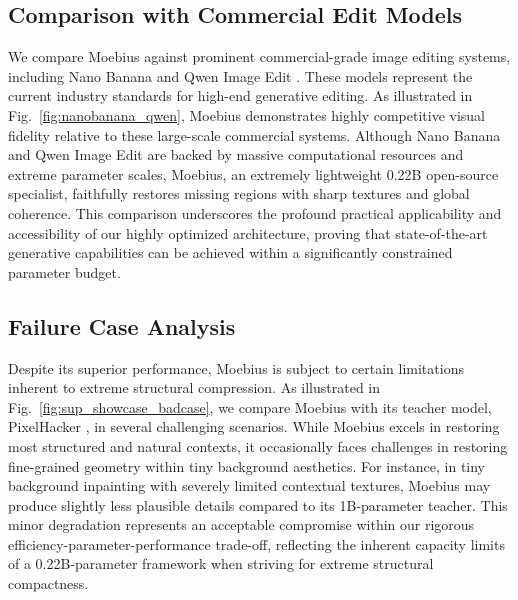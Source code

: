 \documentclass[runningheads]{llncs}
\begin{document}
\subsection*{Comparison with Commercial Edit Models} \label{sec:sup_commercial}
We compare Moebius against prominent commercial-grade image editing systems, including Nano Banana \cite{2025nano_banana} and Qwen Image Edit \cite{wu2025qwenimagetechnicalreport}. These models represent the current industry standards for high-end generative editing. As illustrated in Fig.~\ref{fig:nanobanana_qwen}, Moebius demonstrates highly competitive visual fidelity relative to these large-scale commercial systems. Although Nano Banana and Qwen Image Edit are backed by massive computational resources and extreme parameter scales, Moebius, an extremely lightweight 0.22B open-source specialist, faithfully restores missing regions with sharp textures and global coherence. This comparison underscores the profound practical applicability and accessibility of our highly optimized architecture, proving that state-of-the-art generative capabilities can be achieved within a significantly constrained parameter budget.


\vspace{-0.5em}
\subsection*{Failure Case Analysis} \label{sec:sup_failure}
\vspace{-2.5em}
Despite its superior performance, Moebius is subject to certain limitations inherent to extreme structural compression. As illustrated in Fig.~\ref{fig:sup_showcase_badcase}, we compare Moebius with its teacher model, PixelHacker \cite{xu2025pixelhacker}, in several challenging scenarios. While Moebius excels in restoring most structured and natural contexts, it occasionally faces challenges in restoring fine-grained geometry within tiny background aesthetics. For instance, in tiny background inpainting with severely limited contextual textures, Moebius may produce slightly less plausible details compared to its 1B-parameter teacher. This minor degradation represents an acceptable compromise within our rigorous efficiency-parameter-performance trade-off, reflecting the inherent capacity limits of a 0.22B-parameter framework when striving for extreme structural compactness.
\end{document}
